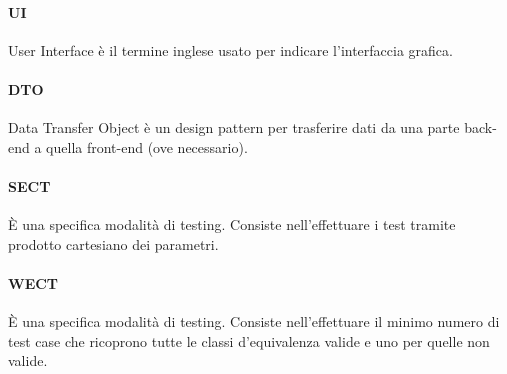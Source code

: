 \paragraph{UI} User Interface è il termine inglese usato per indicare l'interfaccia grafica.

\paragraph{DTO} Data Transfer Object è un design pattern per trasferire dati da una parte back-end a quella front-end (ove necessario).

\paragraph{SECT} \`{E} una specifica modalità di testing. Consiste nell'effettuare i test tramite prodotto cartesiano dei parametri.

\paragraph{WECT} \`{E} una specifica modalità di testing. Consiste nell'effettuare il minimo numero di test case che ricoprono tutte le classi d'equivalenza valide e uno per quelle non valide.